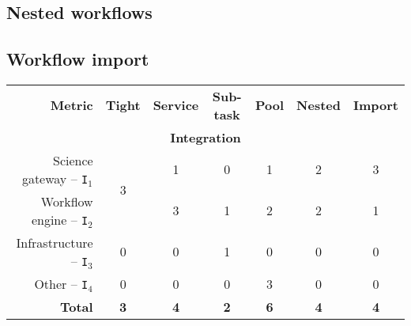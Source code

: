 \documentclass[preprint,3p,twocolumn]{elsarticle}
\begin{document}
\subsection{Nested workflows}

\subsection{Workflow import}

\begin{table*}
\centering
\begin{tabular}{rcccccc}
\textbf{Metric}                      & \textbf{Tight}
                                     & \textbf{Service}
                                     & \textbf{Sub-task}
                                     & \textbf{Pool}
                                     & \textbf{Nested}
                                     & \textbf{Import} \\
\multicolumn{7}{c}{\cellcolor[HTML]{EEEEEE}\textbf{Integration}}\\
Science gateway -- \texttt{I$_1$}    & \multirow{2}{*}{3}
                                     & \cellcolor[HTML]{99FF99}1
                                     & \cellcolor[HTML]{99FF99}0  
                                     & \cellcolor[HTML]{99FF99}1
                                     & \cellcolor[HTML]{99FF99}2
                                     & \cellcolor[HTML]{99AA99}3 \\
Workflow engine -- \texttt{I$_2$}    &
                                     & \cellcolor[HTML]{99FF99}3 
                                     & \cellcolor[HTML]{99FF99}1
                                     & \cellcolor[HTML]{99AA99}2
                                     & \cellcolor[HTML]{99AA99}2
                                     & \cellcolor[HTML]{99FF99}1 \\
Infrastructure -- \texttt{I$_3$}   & \cellcolor[HTML]{99FF99}0
                                     & \cellcolor[HTML]{99FF99}0
                                     & \cellcolor[HTML]{99FF99}1
                                     & \cellcolor[HTML]{99AA99}0
                                     & \cellcolor[HTML]{99AA99}0
                                     & \cellcolor[HTML]{99FF99}0 \\
Other -- \texttt{I$_4$}              & \cellcolor[HTML]{99FF99}0
                                     & \cellcolor[HTML]{99FF99}0
                                     & \cellcolor[HTML]{99FF99}0
                                     & \cellcolor[HTML]{99AA99}3
                                     & \cellcolor[HTML]{99AA99}0
                                     & \cellcolor[HTML]{99FF99}0 \\
\textbf{Total}                       & \cellcolor[HTML]{99FF99}\textbf{3}
                                     & \cellcolor[HTML]{99FF99}\textbf{4}
                                     & \cellcolor[HTML]{99FF99}\textbf{2}
                                     & \cellcolor[HTML]{99AA99}\textbf{6}
                                     & \cellcolor[HTML]{99AA99}\textbf{4}
                                     & \cellcolor[HTML]{99AA99}\textbf{4} \\


\end{tabular}
\end{table*}
\end{document}
